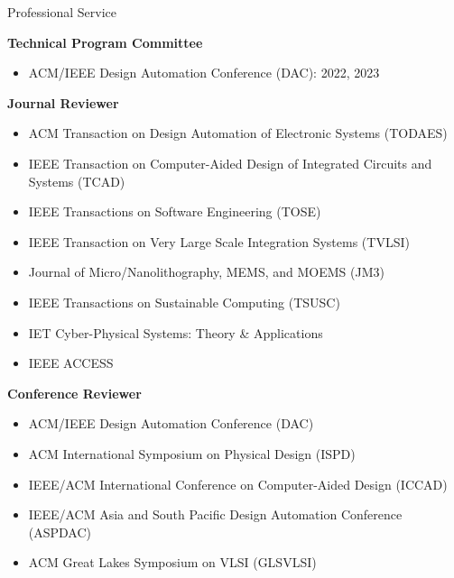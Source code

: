 \iftrue
\begin{rSection}{Professional Service}
	
\textbf{Technical Program Committee}
\begin{itemize}
	\item ACM/IEEE Design Automation Conference (DAC): 2022, 2023
\end{itemize}

\textbf{Journal Reviewer}
\begin{itemize}
    \item ACM Transaction on Design Automation of Electronic Systems (TODAES)
    \item IEEE Transaction on Computer-Aided Design of Integrated Circuits and Systems (TCAD)
    \item IEEE Transactions on Software Engineering (TOSE)
    \item IEEE Transaction on Very Large Scale Integration Systems (TVLSI)
    \item Journal of Micro/Nanolithography, MEMS, and MOEMS (JM3)
    \item IEEE Transactions on Sustainable Computing (TSUSC)
    \item IET Cyber-Physical Systems: Theory \& Applications
    \item IEEE ACCESS
\end{itemize}

\textbf{Conference Reviewer}
\begin{itemize}
    \item ACM/IEEE Design Automation Conference (DAC)
    \item ACM International Symposium on Physical Design (ISPD)
    \item IEEE/ACM International Conference on Computer-Aided Design (ICCAD)
    \item IEEE/ACM Asia and South Pacific Design Automation Conference (ASPDAC)
	\item ACM Great Lakes Symposium on VLSI (GLSVLSI)
\end{itemize}
\end{rSection}
\fi

